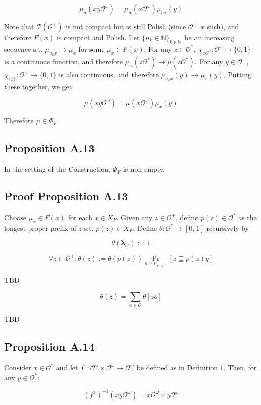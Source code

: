 \documentclass[a4paper]{article}
\DeclareMathOperator{\Prb}{Pr}
\newcommand{\Nats}{\mathbb{N}}
\newcommand{\Estr}{\bm{\lambda}}
\newcommand{\Prob}{\mathcal{P}}
\newcommand{\Obs}{\mathcal{O}}
\newcommand{\ObsO}{\Obs^\omega}
\begin{document}
$$\mu_n(xy\ObsO) = \mu_n(x\ObsO) \mu_{nx}(y)$$

Note that ${\Prob(\Obs^+)}$ is not compact but is still Polish (since ${\Obs^+}$ is such), and therefore ${F(x)}$ is compact and Polish. Let ${\{n_k \in \Nats\}_{k \in \Nats}}$ be an increasing sequence s.t. ${\mu_{n_kx} \rightarrow \mu_x}$ for some ${\mu_x \in F(x)}$. For any ${z \in \Obs^*}$, ${\chi_{z\ObsO}: \ObsO \rightarrow \{0,1\}}$ is a continuous function, and therefore ${\mu_{n}(z\Obs^*) \rightarrow \mu(z\Obs^*)}$. For any ${y \in \Obs^+}$, ${\chi_{\{y\}}: \Obs^+ \rightarrow \{0,1\}}$ is also continuous, and therefore ${\mu_{n_k x}(y) \rightarrow \mu_x(y)}$. Putting these together, we get

$$\mu(xy\ObsO) = \mu(x\ObsO) \mu_{x}(y)$$

Therefore ${\mu \in \Phi_F}$.

\subsection{Proposition A.13}

In the setting of the Construction, ${\Phi_F}$ is non-empty.

\subsection{Proof Proposition A.13}

Choose ${\mu_x \in F(x)}$ for each ${x \in X_F}$. Given any ${z \in \Obs^+}$, define ${p(z) \in \Obs^*}$ as the longest proper prefix of ${z}$ s.t. ${p(z) \in X_F}$. Define ${\theta: \Obs^* \rightarrow [0,1]}$ recursively by

$$\theta(\Estr_\Obs):=1$$

$$\forall z \in \Obs^+: \theta(z):=\theta(p(z)) \Prb_{y \sim \mu_{p(z)}}[z \sqsubseteq p(z)y]$$

TBD

$$\theta(z)=\sum_{o \in \Obs} \theta[zo]$$

TBD

\subsection{Proposition A.14}

Consider ${x \in \Obs^*}$ and let ${f^x: \ObsO \times \ObsO \rightarrow \ObsO}$ be defined as in Definition 1. Then, for any ${y \in \Obs^*}$:

$${(f^x)^{-1}(xy\ObsO) = x\ObsO \times y\ObsO}$$
\end{document}
